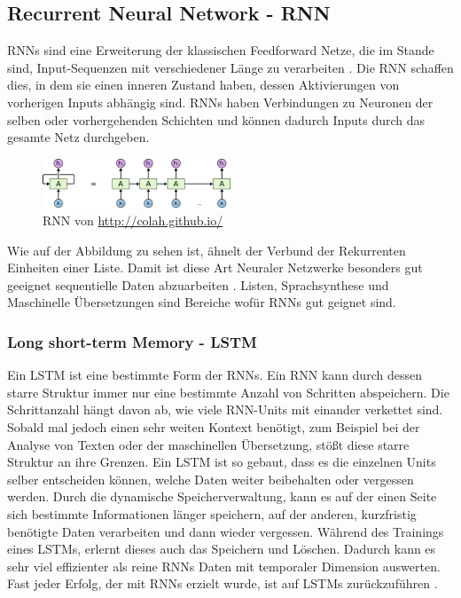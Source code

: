 \documentclass[pdftex,a4paper,halfparskip, article]{scrartcl}
\begin{document}
\subsection{Recurrent Neural Network - RNN}

RNNs sind eine Erweiterung der klassischen Feedforward Netze, die im Stande sind, Input-Sequenzen mit verschiedener Länge zu verarbeiten \cite{paperGRUComparison}. Die RNN schaffen dies, in dem sie einen inneren Zustand haben, dessen Aktivierungen von vorherigen Inputs abhängig sind.
RNNs haben Verbindungen zu Neuronen der selben oder vorhergehenden Schichten und können dadurch Inputs durch das gesamte Netz durchgeben. 

\begin{figure}[h]
\centering
\includegraphics[width=0.5\textwidth]{colah_rnn}
\caption{RNN von \url{http://colah.github.io/}}
\end{figure}

Wie auf der Abbildung zu sehen ist, ähnelt der Verbund der Rekurrenten Einheiten einer Liste. Damit ist diese Art Neuraler Netzwerke besonders gut geeignet sequentielle Daten abzuarbeiten \cite{colahsBlogLSTM}. Listen, Sprachsynthese und Maschinelle Übersetzungen sind Bereiche wofür RNNs gut geignet sind.



\subsubsection{Long short-term Memory - LSTM}

Ein LSTM ist eine bestimmte Form der RNNs. Ein RNN kann durch dessen starre Struktur immer nur eine bestimmte Anzahl von Schritten abspeichern. Die Schrittanzahl hängt davon ab, wie viele RNN-Units mit einander verkettet sind. Sobald mal jedoch einen sehr weiten Kontext benötigt, zum Beispiel bei der Analyse von Texten oder der maschinellen Übersetzung, stößt diese starre Struktur an ihre Grenzen. Ein LSTM ist so gebaut, dass es die einzelnen Units selber entscheiden können, welche Daten weiter beibehalten oder vergessen werden. Durch die dynamische Speicherverwaltung, kann es auf der einen Seite sich bestimmte Informationen länger speichern, auf der anderen, kurzfristig benötigte Daten verarbeiten und dann wieder vergessen. Während des Trainings eines LSTMs, erlernt dieses auch das Speichern und Löschen. Dadurch kann es sehr viel effizienter als reine RNNs Daten mit temporaler Dimension auswerten. Fast jeder Erfolg, der mit RNNs erzielt wurde, ist auf LSTMs zurückzuführen \cite{colahsBlogLSTM}. 
\end{document}
